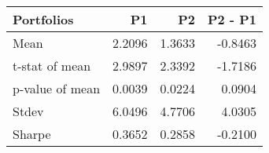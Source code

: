 \begin{tabular}{lrrr}
\toprule
Portfolios & P1 & P2 & P2 - P1 \\
\midrule
Mean & 2.2096 & 1.3633 & -0.8463 \\
t-stat of mean & 2.9897 & 2.3392 & -1.7186 \\
p-value of mean & 0.0039 & 0.0224 & 0.0904 \\
Stdev & 6.0496 & 4.7706 & 4.0305 \\
Sharpe & 0.3652 & 0.2858 & -0.2100 \\
\bottomrule
\end{tabular}
